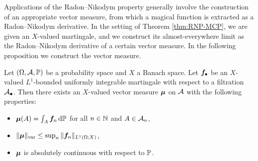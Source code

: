Applications of the Radon--Nikodym property generally involve the construction of an appropriate vector measure, from which a magical function is extracted as a Radon--Nikodym derivative.
In the setting of Theorem \ref{thm:RNP-MCP}, we are given an $X$-valued martingale, and we construct its almost-everywhere limit as the Radon--Nikodym derivative of a certain vector measure.
In the following proposition we construct the vector measure.

\begin{prop}\label{prop:martingale-measure} 
  Let $(\Omega,\mc{A},\P)$ be a probability space and $X$ a Banach space.
  Let $\mb{f}_{\bullet}$ be an $X$-valued $L^1$-bounded uniformly integrable martingale with respect to a filtration $\mc{A}_{\bullet}$.
  Then there exists an $X$-valued vector measure $\mb{\mu}$ on $\mc{A}$ with the following properties:
  \begin{itemize}
  \item $\mb{\mu}(A) = \int_{A} \mb{f}_n \, \dd\P$ for all $n \in \N$ and $A \in \mc{A}_{n}$,
  \item $\|\mb{\mu}\|_{\var} \leq \sup_{n} \|\mb{f}_n\|_{L^1(\Omega;X)}$,
  \item $\mb{\mu}$ is absolutely continuous with respect to $\P$.
  \end{itemize}
\end{prop}

